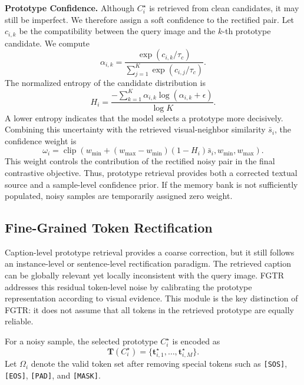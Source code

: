 \noindent\textbf{Prototype Confidence.}
Although $C_i^{\star}$ is retrieved from clean candidates, it may still be imperfect. We therefore assign a soft confidence to the rectified pair. Let $c_{i,k}$ be the compatibility between the query image and the $k$-th prototype candidate. We compute
\begin{equation}
    \alpha_{i,k}=
    \frac{\exp(c_{i,k}/\tau_c)}
    {\sum_{j=1}^{K}\exp(c_{i,j}/\tau_c)}.
\end{equation}
The normalized entropy of the candidate distribution is
\begin{equation}
    H_i=
    \frac{-\sum_{k=1}^{K}\alpha_{i,k}\log(\alpha_{i,k}+\epsilon)}
    {\log K}.
\end{equation}
A lower entropy indicates that the model selects a prototype more decisively. Combining this uncertainty with the retrieved visual-neighbor similarity $\bar{s}_i$, the confidence weight is
\begin{equation}
    \omega_i=
    \operatorname{clip}
    \left(
    w_{\min}+(w_{\max}-w_{\min})(1-H_i)\bar{s}_i,
    w_{\min},w_{\max}
    \right).
\end{equation}
This weight controls the contribution of the rectified noisy pair in the final contrastive objective. Thus, prototype retrieval provides both a corrected textual source and a sample-level confidence prior. If the memory bank is not sufficiently populated, noisy samples are temporarily assigned zero weight.

\subsection{Fine-Grained Token Rectification}
Caption-level prototype retrieval provides a coarse correction, but it still follows an instance-level or sentence-level rectification paradigm. The retrieved caption can be globally relevant yet locally inconsistent with the query image. FGTR addresses this residual token-level noise by calibrating the prototype representation according to visual evidence. This module is the key distinction of FGTR: it does not assume that all tokens in the retrieved prototype are equally reliable.

For a noisy sample, the selected prototype $C_i^{\star}$ is encoded as
\begin{equation}
    \mathbf{T}(C_i^{\star})=
    \{\boldsymbol{t}_{i,1}^{\star},\ldots,\boldsymbol{t}_{i,M}^{\star}\}.
\end{equation}
Let $\Omega_i$ denote the valid token set after removing special tokens such as \texttt{[SOS]}, \texttt{[EOS]}, \texttt{[PAD]}, and \texttt{[MASK]}.

